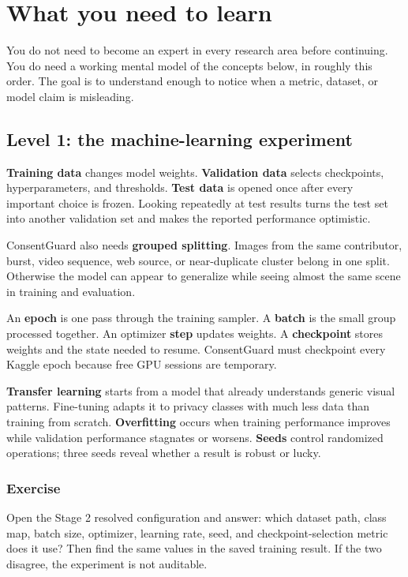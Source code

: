 \chapter{What you need to learn}

You do not need to become an expert in every research area before continuing. You do need a working mental model of the concepts below, in roughly this order. The goal is to understand enough to notice when a metric, dataset, or model claim is misleading.

\section{Level 1: the machine-learning experiment}

\begin{conceptbox}
\textbf{Training data} changes model weights. \textbf{Validation data} selects checkpoints, hyperparameters, and thresholds. \textbf{Test data} is opened once after every important choice is frozen. Looking repeatedly at test results turns the test set into another validation set and makes the reported performance optimistic.
\end{conceptbox}

ConsentGuard also needs \textbf{grouped splitting}. Images from the same contributor, burst, video sequence, web source, or near-duplicate cluster belong in one split. Otherwise the model can appear to generalize while seeing almost the same scene in training and evaluation.

\begin{conceptbox}
An \textbf{epoch} is one pass through the training sampler. A \textbf{batch} is the small group processed together. An optimizer \textbf{step} updates weights. A \textbf{checkpoint} stores weights and the state needed to resume. ConsentGuard must checkpoint every Kaggle epoch because free GPU sessions are temporary.
\end{conceptbox}

\textbf{Transfer learning} starts from a model that already understands generic visual patterns. Fine-tuning adapts it to privacy classes with much less data than training from scratch. \textbf{Overfitting} occurs when training performance improves while validation performance stagnates or worsens. \textbf{Seeds} control randomized operations; three seeds reveal whether a result is robust or lucky.

\subsection*{Exercise}
Open the Stage 2 resolved configuration and answer: which dataset path, class map, batch size, optimizer, learning rate, seed, and checkpoint-selection metric does it use? Then find the same values in the saved training result. If the two disagree, the experiment is not auditable.

